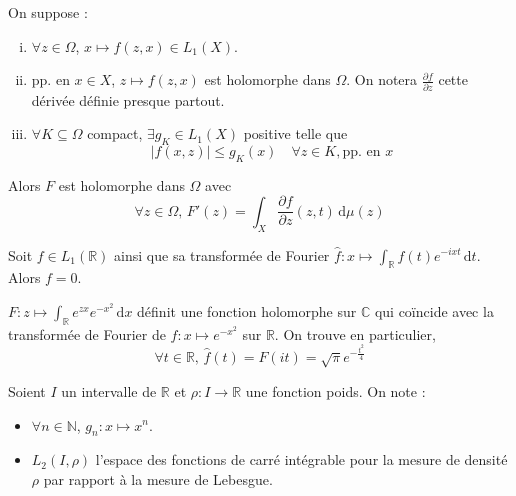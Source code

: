 
	\begin{theorem}
		On suppose :
		\begin{enumerate}[(i)]
			\item $\forall z \in \Omega$, $x \mapsto f(z,x) \in L_1(X)$.
			\item pp. en $x \in X$, $z \mapsto f(z,x)$ est holomorphe dans $\Omega$. On notera $\frac{\partial f}{\partial z}$ cette dérivée définie presque partout.
			\item $\forall K \subseteq \Omega$ compact, $\exists g_K \in L_1(X)$ positive telle que
			\[ \left| f(x,z) \right| \leq g_K(x) \quad \forall z \in K, \text{pp. en } x \]
		\end{enumerate}
		Alors $F$ est holomorphe dans $\Omega$ avec
		\[ \forall z \in \Omega, \, F'(z) = \int_X \frac{\partial f}{\partial z}(z, t) \, \mathrm{d}\mu(z) \]
	\end{theorem}


	\begin{application}
		Soit $f \in L_1(\mathbb{R})$ ainsi que sa transformée de Fourier $\widehat{f} : x \mapsto \int_{\mathbb{R}} f(t) e^{-ixt} \, \mathrm{d}t$. Alors $f = 0$.
	\end{application}


	\begin{application}
		$F : z \mapsto \int_{\mathbb{R}} e^{zx} e^{-x^2} \, \mathrm{d}x$ définit une fonction holomorphe sur $\mathbb{C}$ qui coïncide avec la transformée de Fourier de $f : x \mapsto e^{-x^2}$ sur $\mathbb{R}$. On trouve en particulier,
		\[ \forall t \in \mathbb{R}, \, \widehat{f}(t) = F(it) = \sqrt{\pi} e^{-\frac{t^2}{4}} \]
	\end{application}


	\begin{notation}
		Soient $I$ un intervalle de $\mathbb{R}$ et $\rho : I \rightarrow \mathbb{R}$ une fonction poids. On note :
		\begin{itemize}
			\item $\forall n \in \mathbb{N}$, $g_n : x \mapsto x^n$.
			\item $L_2(I, \rho)$ l'espace des fonctions de carré intégrable pour la mesure de densité $\rho$ par rapport à la mesure de Lebesgue.
		\end{itemize}
	\end{notation}


